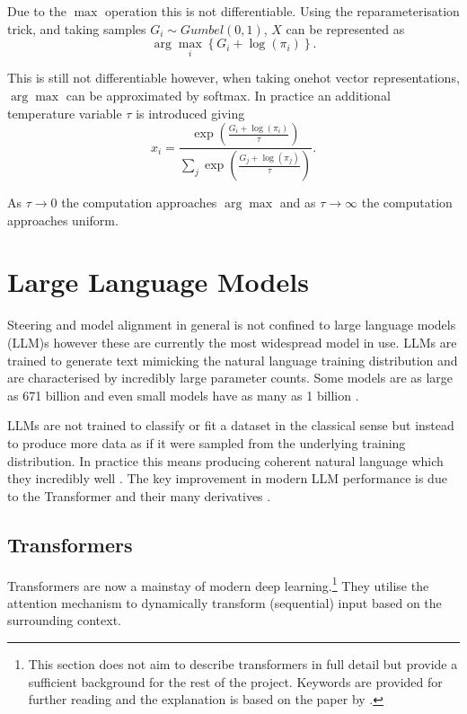 Due to the $\max$ operation this is not differentiable.
Using the reparameterisation trick, and taking samples $G_i \sim Gumbel(0,1)$, $X$ can be represented as
\begin{equation*}
    \arg\max_i\left\{G_i + \log(\pi_i)\right\}.
\end{equation*}

This is still not differentiable however, when taking onehot vector representations, $\arg\max$ can be approximated by softmax.
In practice an additional temperature variable $\tau$ is introduced giving
\begin{equation*}
    x_i = \frac{\exp\left(\frac{G_i + \log(\pi_i)}{\tau}\right)}{\sum_{j}\exp\left(\frac{G_j + \log(\pi_j)}{\tau}\right)}.
\end{equation*}

As $\tau \to 0$ the computation approaches $\arg\max$ and as $\tau \to \infty$ the computation approaches uniform.

\section{Large Language Models}

Steering and model alignment in general is not confined to large language models (LLM)s however these are currently the most widespread model in use.
LLMs are trained to generate text mimicking the natural language training distribution and are characterised by incredibly large parameter counts.
Some models are as large as 671 billion \citep{deepseek} and even small models have as many as 1 billion \citep{gemma}.

LLMs are not trained to classify or fit a dataset in the classical sense but instead to produce more data as if it were sampled from the underlying training distribution.
In practice this means producing coherent natural language which they incredibly well \citep{c.ai}. The key improvement in modern LLM performance is due to the Transformer \citep{transformers} and their many derivatives \citep{linear-attention, bigbird, linformer}.

\subsection{Transformers}

Transformers \citep{transformers} are now a mainstay of modern deep learning.\footnote{This section does not aim to describe transformers in full detail but provide a sufficient background for the rest of the project.
Keywords are provided for further reading and the explanation is based on the paper by \citet{turner2023}.}
They utilise the attention mechanism to dynamically transform (sequential) input based on the surrounding context.

